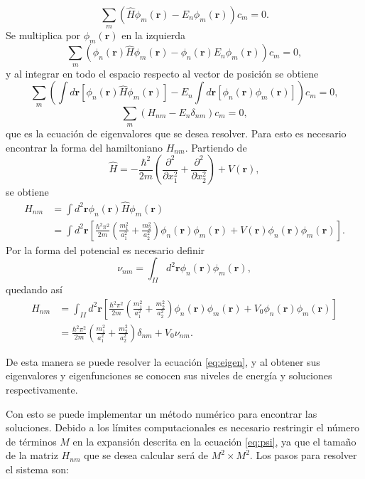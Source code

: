 \documentclass[letterpaper,11pt]{article}
\renewcommand{\vec}[1]{\mathbf{#1}}
\begin{document}
\[
	\sum_m \left( \hat{H} \phi_m (\vec{r}) - E_n \phi_m (\vec{r}) \right) c_m = 0.
\]
Se multiplica por $\phi_m (\vec{r})$ en la izquierda
\[
	\sum_m \left( \phi_n (\vec{r}) \hat{H} \phi_m (\vec{r}) - \phi_n(\vec{r}) E_n \phi_m (\vec{r}) \right) c_m = 0,
\]
y al integrar en todo el espacio respecto al vector de posición se obtiene
\[
	\sum_m \left( \int d \vec{r} \left[ \phi_n (\vec{r}) \hat{H} \phi_m (\vec{r}) \right] - E_n \int d \vec{r} \left[ \phi_n(\vec{r}) \phi_m (\vec{r}) \right] \right) c_m = 0,
\]
\begin{equation} \label{eq:eigen}
	\sum_m \left( H_{nm} - E_n \delta_{nm} \right) c_m = 0,
\end{equation}
que es la ecuación de eigenvalores que se desea resolver.
Para esto es necesario encontrar la forma del hamiltoniano $H_{nm}$. Partiendo de
\[
	\hat{H} = - \frac{\hbar^2}{2 m} \left( \frac{\partial^2}{\partial x_1^2} + \frac{\partial^2}{\partial x_2^2} \right) + V(\vec{r}),
\]
se obtiene
\begin{align*}
	H_{nm} &= \int d^2 \vec{r} \phi_n (\vec{r}) \hat{H} \phi_m (\vec{r}) \\
	&= \int  d^2 \vec{r} \left[ \frac{\hbar^2 \pi^2}{2 m} \left( \frac{m_1^2}{a_1^2} + \frac{m_2^2}{a_2^2} \right) \phi_n (\vec{r}) \phi_m (\vec{r}) + V(\vec{r}) \phi_n (\vec{r}) \phi_m (\vec{r}) \right].
\end{align*}
Por la forma del potencial es necesario definir
\begin{equation}
	\nu_{nm} = \int_{II} d^2 \vec{r} \phi_n (\vec{r}) \phi_m (\vec{r}),
\end{equation}
quedando así
\begin{align*}
	H_{nm} &= \int_{II}  d^2 \vec{r} \left[ \frac{\hbar^2 \pi^2}{2 m} \left( \frac{m_1^2}{a_1^2} + \frac{m_2^2}{a_2^2} \right) \phi_n (\vec{r}) \phi_m (\vec{r}) + V_0 \phi_n (\vec{r}) \phi_m (\vec{r}) \right] \\
	&= \frac{\hbar^2 \pi^2}{2 m} \left( \frac{m_1^2}{a_1^2} + \frac{m_2^2}{a_2^2} \right) \delta_{nm} + V_0 \nu_{nm}.
\end{align*}

De esta manera se puede resolver la ecuación \ref{eq:eigen}, y al obtener sus eigenvalores y eigenfunciones se conocen sus niveles de energía y soluciones respectivamente.

Con esto se puede implementar un método numérico para encontrar las soluciones. Debido a los límites computacionales es necesario restringir el número de términos $M$ en la expansión descrita en la ecuación \ref{eq:psi}, ya que el tamaño de la matriz $H_{nm}$ que se desea calcular será de $M^2 \times M^2$.
Los pasos para resolver el sistema son:
\end{document}
